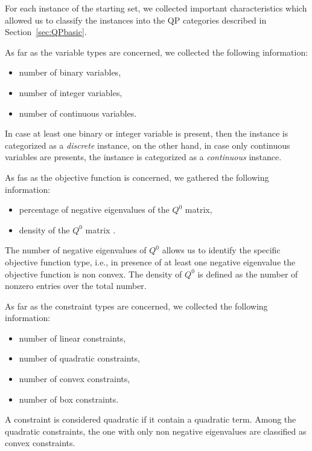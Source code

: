 



For each instance of the starting set, we collected important 
characteristics which allowed us to classify the instances into the
QP categories described in Section~\ref{sec:QPbasic}.


As far as the variable types are concerned, we collected the following information:
\begin{itemize}
\item number of binary variables, %
\item number of integer variables, %
\item number of continuous variables. %
\end{itemize}

In case at least one binary or integer variable is present, then the
instance is categorized as a \emph{discrete} instance, on the other
hand, in case only continuous variables are presents, the instance is
categorized as a \emph{continuous} instance.

As fas as the objective function is concerned, we gathered the
following information:
\begin{itemize}
\item percentage of negative eigenvalues of the $Q^0$ matrix,  %
\item density of the $Q^0$ matrix . %
\end{itemize}
 The number of negative eigenvalues of $Q^0$ allows us to
identify the specific objective function type, i.e., in presence of at
least one negative eigenvalue the objective function is non convex.
The density of $Q^0$ is defined as the
number of nonzero entries  over the total number.

As far as the constraint types are concerned, we collected the following information:
\begin{itemize}
\item number of linear constraints, %
\item number of quadratic constraints, %
\item number of convex constraints, %
\item number of box constraints. %
\end{itemize}
A constraint is considered quadratic if it contain a quadratic term.
Among the quadratic constraints, the one with only non negative
eigenvalues are classified as convex constraints.

